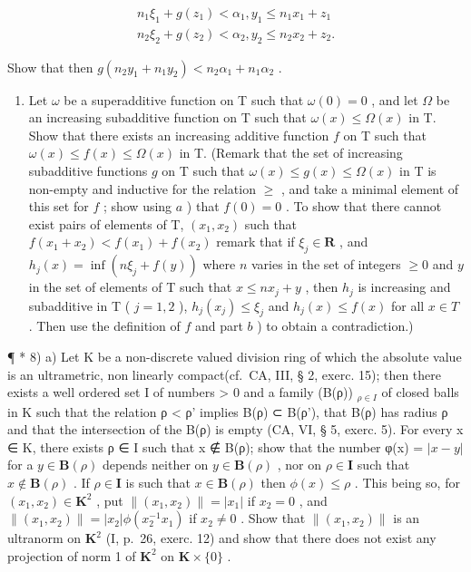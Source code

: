 \[
\begin{array}{l} n _ {1} \xi_ {1} + g (z _ {1}) <   \alpha_ {1}, y _ {1} \leqslant n _ {1} x _ {1} + z _ {1} \\ n _ {2} \xi_ {2} + g (z _ {2}) <   \alpha_ {2}, y _ {2} \leqslant n _ {2} x _ {2} + z _ {2}. \end{array}
\]

Show that then \(g(n_2y_1 + n_1y_2) < n_2\alpha_1 + n_1\alpha_2\) .

\begin{enumerate}
\def\labelenumi{\alph{enumi})}
\setcounter{enumi}{2}
\tightlist
\item
  Let \(\omega\) be a superadditive function on T such that \(\omega(0) = 0\) , and let \(\Omega\) be an increasing subadditive function on T such that \(\omega(x) \leqslant \Omega(x)\) in T. Show that there exists an increasing additive function \(f\) on T such that \(\omega(x) \leqslant f(x) \leqslant \Omega(x)\) in T. (Remark that the set of increasing subadditive functions \(g\) on T such that \(\omega(x) \leqslant g(x) \leqslant \Omega(x)\) in T is non-empty and inductive for the relation \(\geqslant\) , and take a minimal element of this set for \(f\) ; show using \(a\) ) that \(f(0) = 0\) . To show that there cannot exist pairs of elements of T, \((x_1, x_2)\) such that \(f(x_1 + x_2) < f(x_1) + f(x_2)\) remark that if \(\xi_j \in \mathbf{R}\) , and \(h_j(x) = \inf(n\xi_j + f(y))\) where \(n\) varies in the set of integers \(\geqslant 0\) and \(y\) in the set of elements of T such that \(x \leqslant nx_j + y\) , then \(h_j\) is increasing and subadditive in T ( \(j = 1, 2\) ), \(h_j(x_j) \leqslant \xi_j\) and \(h_j(x) \leqslant f(x)\) for all \(x \in T\) . Then use the definition of \(f\) and part \(b\) ) to obtain a contradiction.)
\end{enumerate}

¶ * 8) a) Let K be a non-discrete valued division ring of which the absolute value is an ultrametric, non linearly compact(cf.~CA, III, § 2, exerc. 15); then there exists a well ordered set I of numbers > 0 and a family (B(ρ)) \(_{ρ \in I}\) of closed balls in K such that the relation ρ < ρ' implies B(ρ) ⊂ B(ρ'), that B(ρ) has radius ρ and that the intersection of the B(ρ) is empty (CA, VI, § 5, exerc. 5). For every x ∈ K, there exists ρ ∈ I such that x ∉ B(ρ); show that the number φ(x) = \(|x-y|\) for a \(y \in \mathbf{B}(\rho)\) depends neither on \(y \in \mathbf{B}(\rho)\) , nor on \(\rho \in \mathbf{I}\) such that \(x \notin \mathbf{B}(\rho)\) . If \(\rho \in \mathbf{I}\) is such that \(x \in \mathbf{B}(\rho)\) then \(\phi(x) \leqslant \rho\) . This being so, for \((x_1, x_2) \in \mathbf{K}^2\) , put \(\| (x_1, x_2) \| = |x_1|\) if \(x_2 = 0\) , and \(\| (x_1, x_2) \| = |x_2| \phi(x_2^{-1} x_1)\) if \(x_2 \neq 0\) . Show that \(\| (x_1, x_2) \|\) is an ultranorm on \(\mathbf{K}^2\) (I, p.~26, exerc. 12) and show that there does not exist any projection of norm 1 of \(\mathbf{K}^2\) on \(\mathbf{K} \times \{0\}\) .

